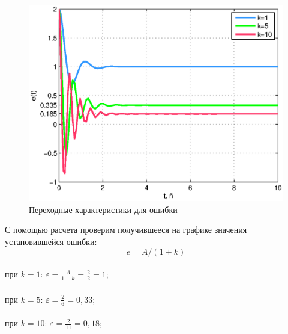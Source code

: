 \documentclass[12pt,a4paper]{article}
\begin{document}
\begin{figure}[H]
	\centering
	\includegraphics[width=0.8\linewidth]{scheme/plot2.eps}
	\caption{Переходные характеристики для ошибки}
\end{figure}

С помощью расчета проверим получившееся на графике значения установившейся ошибки:
\begin{equation}
e=A/(1+k)
\end{equation}
\newpage
\\при $k=1$: $\varepsilon = \displaystyle{\frac{A}{1+k}}={\frac{2}{2}}=1;$\\
\\при $k=5$: $\varepsilon = \displaystyle{\frac{2}{6}}=0,33;$\\
\\при $k=10$: $\varepsilon = \displaystyle{\frac{2}{11}}=0,18;$\\
\end{document}
